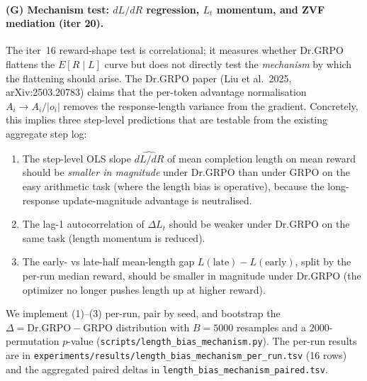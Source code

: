 \documentclass{article}
\begin{document}
\paragraph{(G) Mechanism test: $dL/dR$ regression, $L_t$ momentum, and ZVF mediation (iter 20).}
The iter~16 reward-shape test is correlational; it measures whether Dr.GRPO
flattens the $E[R\mid L]$ curve but does not directly test the
\emph{mechanism} by which the flattening should arise. The Dr.GRPO paper
(Liu et al.\ 2025, arXiv:2503.20783) claims that the per-token advantage
normalisation $A_i \to A_i / |o_i|$ removes the response-length variance
from the gradient. Concretely, this implies three step-level predictions
that are testable from the existing aggregate step log:
\begin{enumerate}
\item The step-level OLS slope $\widehat{dL/dR}$ of mean completion
  length on mean reward should be \emph{smaller in magnitude} under
  Dr.GRPO than under GRPO on the easy arithmetic task (where the length
  bias is operative), because the long-response update-magnitude
  advantage is neutralised.
\item The lag-1 autocorrelation of $\Delta L_t$ should be weaker under
  Dr.GRPO on the same task (length momentum is reduced).
\item The early- vs late-half mean-length gap $L(\text{late}) - L(\text{early})$,
  split by the per-run median reward, should be smaller in magnitude
  under Dr.GRPO (the optimizer no longer pushes length up at higher reward).
\end{enumerate}
We implement (1)--(3) per-run, pair by seed, and bootstrap the
$\Delta = \text{Dr.GRPO} - \text{GRPO}$ distribution with $B{=}5000$
resamples and a $2000$-permutation $p$-value
(\texttt{scripts/length\_bias\_mechanism.py}). The per-run results are
in \texttt{experiments/results/length\_bias\_mechanism\_per\_run.tsv}
(16 rows) and the aggregated paired deltas in
\texttt{length\_bias\_mechanism\_paired.tsv}.
\end{document}
